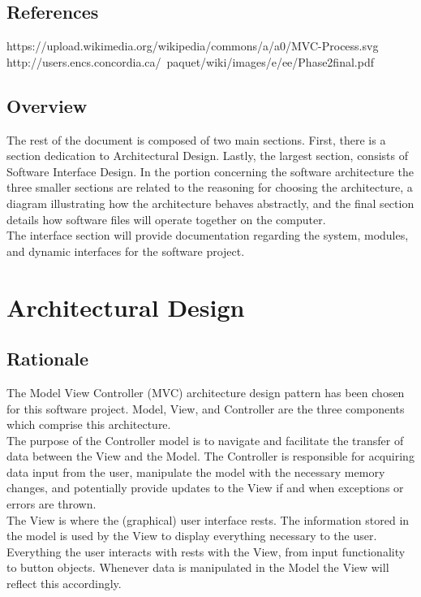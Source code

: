 \documentclass{scrreprt}
\begin{document}
\section{References}
https://upload.wikimedia.org/wikipedia/commons/a/a0/MVC-Process.svg \\
http://users.encs.concordia.ca/~paquet/wiki/images/e/ee/Phase2final.pdf
\section{Overview}
The rest of the document is composed of two main sections. First, there is a section dedication to Architectural Design. Lastly, the largest section, consists of Software Interface Design. In the portion concerning the software architecture the three smaller sections are related to the reasoning for choosing the architecture, a diagram illustrating how the architecture behaves abstractly, and the final section details how software files will operate together on the computer. \\
The interface section will provide documentation regarding the system, modules, and dynamic interfaces for the software project.
\chapter{Architectural Design}
\section{Rationale}
The Model View Controller (MVC) architecture design pattern has been chosen for this software project. Model, View, and Controller are the three components which comprise this architecture. \\

The purpose of the Controller model is to navigate and facilitate the transfer of data between the View and the Model. The Controller is responsible for acquiring data input from the user, manipulate the model with the necessary memory changes, and potentially provide updates to the View if and when exceptions or errors are thrown. \\

The View is where the (graphical) user interface rests. The information stored in the model is used by the View to display everything necessary to the user. Everything the user interacts with rests with the View, from input functionality to button objects. Whenever data is manipulated in the Model the View will reflect this accordingly. \\
\end{document}
